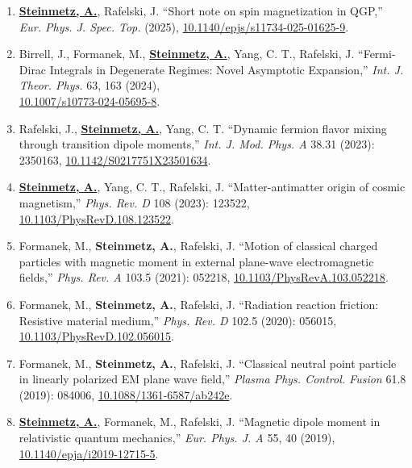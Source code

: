 \documentclass[11pt]{article}
\begin{document}
\begin{enumerate}[leftmargin=*,nosep]
    \item \textbf{\href{https://github.com/ajsteinmetz/short-note-qgp}{Steinmetz, A.}}, Rafelski, J. ``Short note on spin magnetization in QGP,'' \textit{Eur. Phys. J. Spec. Top.} (2025), \href{https://doi.org/10.1140/epjs/s11734-025-01625-9}{10.1140/epjs/s11734-025-01625-9}.
    \item Birrell, J., Formanek, M., \textbf{\href{https://github.com/ajsteinmetz/fermi-distribution}{Steinmetz, A.}}, Yang, C. T., Rafelski, J. ``Fermi-Dirac Integrals in Degenerate Regimes: Novel Asymptotic Expansion,'' \textit{Int. J. Theor. Phys.} 63, 163 (2024),\\ \href{https://doi.org/10.1007/s10773-024-05695-8}{10.1007/s10773-024-05695-8}.
    \item Rafelski, J., \textbf{\href{https://github.com/ajsteinmetz/neutrino-transition-moments}{Steinmetz, A.}}, Yang, C. T. ``Dynamic fermion flavor mixing through transition dipole moments,'' \textit{Int. J. Mod. Phys. A} 38.31 (2023): 2350163, \href{https://doi.org/10.1142/S0217751X23501634}{10.1142/S0217751X23501634}.
    \item \textbf{\href{https://github.com/ajsteinmetz/plasma-partition}{Steinmetz, A.}}, Yang, C. T., Rafelski, J. ``Matter-antimatter origin of cosmic magnetism,'' \textit{Phys. Rev. D} 108 (2023): 123522, \href{https://doi.org/10.1103/PhysRevD.108.123522}{10.1103/PhysRevD.108.123522}.
    \item Formanek, M., \textbf{Steinmetz, A.}, Rafelski, J. ``Motion of classical charged particles with magnetic moment in external plane-wave electromagnetic fields,'' \textit{Phys. Rev. A} 103.5 (2021): 052218, \href{https://doi.org/10.1103/PhysRevA.103.052218}{10.1103/PhysRevA.103.052218}.
    \item Formanek, M., \textbf{Steinmetz, A.}, Rafelski, J. ``Radiation reaction friction: Resistive material medium,'' \textit{Phys. Rev. D} 102.5 (2020): 056015, \href{https://doi.org/10.1103/PhysRevD.102.056015}{10.1103/PhysRevD.102.056015}.
    \item Formanek, M., \textbf{Steinmetz, A.}, Rafelski, J. ``Classical neutral point particle in linearly polarized EM plane wave field,'' \textit{Plasma Phys. Control. Fusion} 61.8 (2019): 084006, \href{https://doi.org/10.1088/1361-6587/ab242e}{10.1088/1361-6587/ab242e}.
    \item \textbf{\href{https://github.com/ajsteinmetz/magnetic-dipole-moment}{Steinmetz, A.}}, Formanek, M., Rafelski, J. ``Magnetic dipole moment in relativistic quantum mechanics,'' \textit{Eur. Phys. J. A} 55, 40 (2019), \href{https://doi.org/10.1140/epja/i2019-12715-5}{10.1140/epja/i2019-12715-5}.

\end{enumerate}
\end{document}
